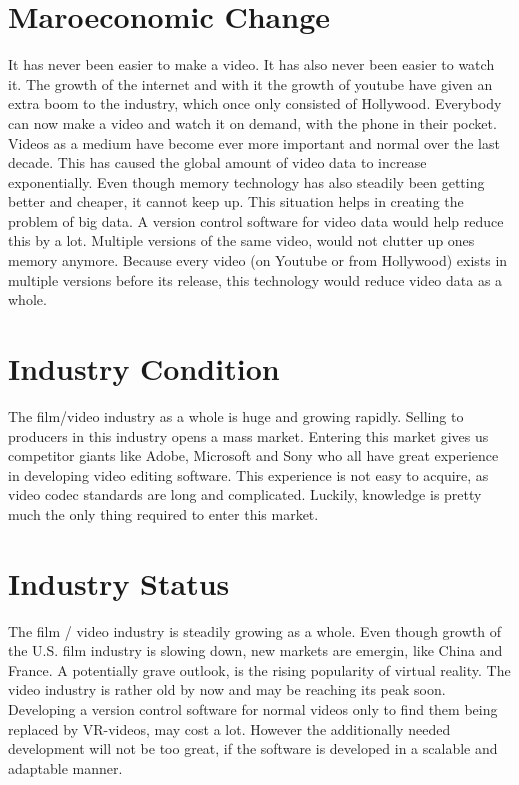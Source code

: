\documentclass{sig-alternate-05-2015}
\begin{document}
\section{Maroeconomic Change}
It has never been easier to make a video. It has also never been easier to watch it. The growth of the internet and with it the growth of youtube have given an extra boom to the industry, which once only consisted of Hollywood. Everybody can now make a video and watch it on demand, with the phone in their pocket. Videos as a medium have become ever more important and normal over the last decade.
This has caused the global amount of video data to increase exponentially. Even though memory technology has also steadily been getting better and cheaper, it cannot keep up. This situation helps in creating the problem of big data.
A version control software for video data would help reduce this by a lot. Multiple versions of the same video, would not clutter up ones memory anymore. Because every video (on Youtube or from Hollywood) exists in multiple versions before its release, this technology would reduce video data as a whole.

\section{Industry Condition}
The film/video industry as a whole is huge and growing rapidly. Selling to producers in this industry opens a mass market. Entering this market gives us competitor giants like Adobe, Microsoft and Sony who all have great experience in developing video editing software. This experience is not easy to acquire, as video codec standards are long and complicated. Luckily, knowledge is pretty much the only thing required to enter this market. 

\section{Industry Status}
The film / video industry is steadily growing as a whole. Even though growth of the U.S. film industry is slowing down, new markets are emergin, like China and France. A potentially grave outlook, is the rising popularity of virtual reality. The video industry is rather old by now and may be reaching its peak soon. Developing a version control software for normal videos only to find them being replaced by VR-videos, may cost a lot. However the additionally needed development will not be too great, if the software is developed in a scalable and adaptable manner.
\end{document}
